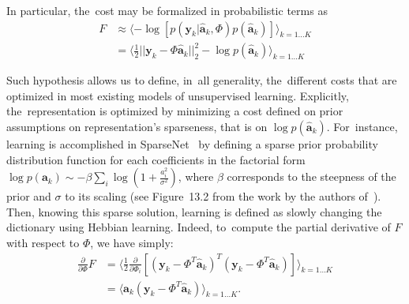 \documentclass[vision,article,accept,oneauthor,pdftex]{Definitions/mdpi}
\newcommand{\coef}{\mathbf{a}} %
\newcommand{\image}{\mathbf{y}} %
\newcommand{\dico}{\Phi} %
\newcommand{\norm}[1]{|\!| #1 |\!|}
\begin{document}
In particular, the~cost %
may be formalized in probabilistic terms as~\citep{Olshausen97}
\begin{align}
F &\approx \langle - \log [ p(\image_k | \hat{\coef}_{k}, \dico ) p(\hat{\coef}_{k}) ]\rangle_{k = 1 \ldots K} \\
&= \langle \frac{1}{2} \norm{\image_k - \dico \hat{\coef}_{k}}_2^2 - \log p(\hat{\coef}_{k})\rangle_{k = 1 \ldots K} \label{eq:sparse_cost} \end{align}

Such hypothesis allows us to define, in~all generality, the~different costs that are optimized in most existing models of unsupervised learning. Explicitly, the~representation is optimized by minimizing a cost defined on prior assumptions on representation's sparseness, that is on $\log p( \hat{\coef}_{k})$. For~instance, learning is accomplished in {\sc SparseNet}~\citep{Olshausen97} by defining a sparse prior probability distribution function for each coefficients in the factorial form $\log p(\coef_{k}) \sim -\beta \sum_i \log ( 1 + \frac{a_i^2}{\sigma^2} )$, where $\beta$ corresponds to the steepness of the prior and $\sigma$ to its scaling (see Figure~13.2 from the work by the authors of~\citep{Olshausen02}). Then, knowing this sparse solution, learning is defined as slowly changing the dictionary using Hebbian learning.
Indeed, to~compute the partial derivative of $F$ with respect to $\dico$, we have simply:
\begin{align}
\frac{\partial }{\partial \dico } F &= \langle\frac{1}{2} \frac{\partial }{\partial \dico_i }[(\image_k - \dico^T \hat{\coef}_{k})^T (\image_k - \dico^T \hat{\coef}_{k})]\rangle_{k = 1 \ldots K} \\
&= \langle\hat{\coef}_{k} (\image_k - \dico^T \hat{\coef}_{k})\rangle_{k = 1 \ldots K}.
\end{align}
\end{document}
